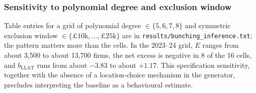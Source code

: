 \subsubsection*{Sensitivity to polynomial degree and exclusion window}

Table entries for a grid of polynomial degree $\in\{5,6,7,8\}$ and symmetric
exclusion window $\in\{\pounds10\text{k},\ldots,\pounds25\text{k}\}$ are in
\texttt{results/bunching\_inference.txt}; the pattern matters more than the
cells. In the 2023--24 grid, $E$ ranges from about 3{,}500 to about
13{,}700 firms, the net excess is negative in 8 of the 16 cells, and
$b_{\mathrm{LLAT}}$ runs from about $-3.83$ to about $+1.17$. This specification
sensitivity, together with the absence of a location-choice mechanism in the
generator, precludes interpreting the baseline as a behavioural estimate.

